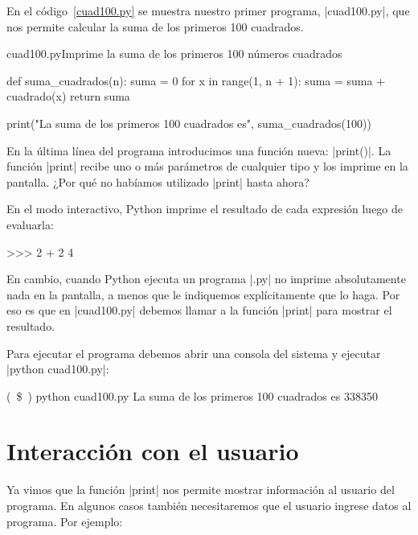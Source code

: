 En el código~\ref{cuad100.py} se muestra nuestro primer programa, |cuad100.py|,
que nos permite calcular la suma de los primeros 100 cuadrados.

\begin{codigo}{cuad100.py}{Imprime la suma de los primeros 100 números
    cuadrados}
\label{cuad100.py}
\begin{codigo-python}
def suma_cuadrados(n):
    suma = 0
    for x in range(1, n + 1):
        suma = suma + cuadrado(x)
    return suma

print("La suma de los primeros 100 cuadrados es", suma_cuadrados(100))
\end{codigo-python}
\end{codigo}

En la última línea del programa introducimos una función nueva: |print()|.
La función |print| recibe uno o más parámetros de cualquier tipo y los imprime
en la pantalla. ¿Por qué no habíamos utilizado |print| hasta ahora?

En el modo interactivo, Python imprime el resultado de cada expresión luego de
evaluarla:

\begin{codigo-python-sn}
>>> 2 + 2
4
\end{codigo-python-sn}

En cambio, cuando Python ejecuta un programa |.py| no imprime absolutamente
nada en la pantalla, a menos que le indiquemos explícitamente que lo haga. Por
eso es que en |cuad100.py| debemos llamar a la función |print| para mostrar el
resultado.

Para ejecutar el programa debemos abrir una consola del sistema y ejecutar
|python cuad100.py|:

\begin{codigo-nohl-sn}
(~\$~) python cuad100.py
La suma de los primeros 100 cuadrados es 338350
\end{codigo-nohl-sn}

\section{Interacción con el usuario}

Ya vimos que la función |print| nos permite mostrar información al usuario del
programa. En algunos casos también necesitaremos que el usuario ingrese datos
al programa. Por ejemplo:

